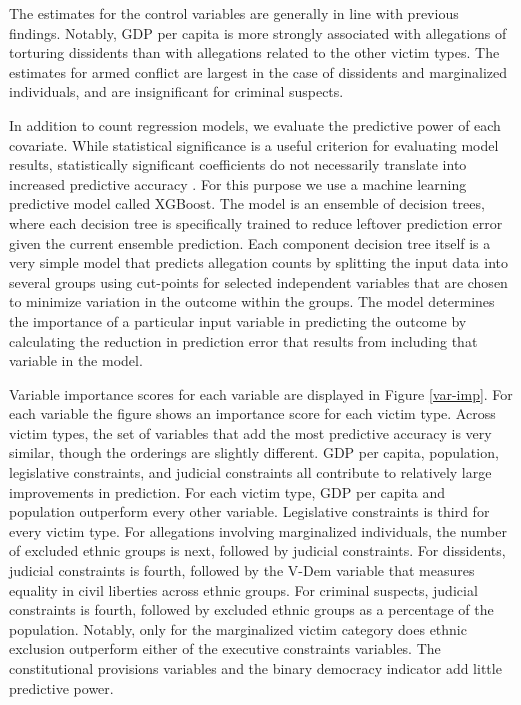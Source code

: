\documentclass[11pt]{article}
\begin{document}
The estimates for the control variables are generally in line with previous findings. Notably, GDP per capita is more strongly associated with allegations of torturing dissidents than with allegations related to the other victim types. The estimates for armed conflict are largest in the case of dissidents and marginalized individuals, and are insignificant for criminal suspects. 

In addition to count regression models, we evaluate the predictive power of each covariate. While statistical significance is a useful criterion for evaluating model results, statistically significant coefficients do not necessarily translate into increased predictive accuracy \citep{ward2010perils,hill2014empirical}. For this purpose we use a machine learning predictive model called XGBoost. The model is an ensemble of decision trees, where each decision tree is specifically trained to reduce leftover prediction error given the current ensemble prediction. Each component decision tree itself is a very simple model that predicts allegation counts by splitting the input data into several groups using cut-points for selected independent variables that are chosen to minimize variation in the outcome within the groups. The model determines the importance of a particular input variable in predicting the outcome by calculating the reduction in prediction error that results from including that variable in the model. 

Variable importance scores for each variable are displayed in Figure \ref{var-imp}. For each variable the figure shows an importance score for each victim type. Across victim types, the set of variables that add the most predictive accuracy is very similar, though the orderings are slightly different. GDP per capita, population, legislative constraints, and judicial constraints all contribute to relatively large improvements in prediction. For each victim type, GDP per capita and population outperform every other variable. Legislative constraints is third for every victim type. For allegations involving marginalized individuals, the number of excluded ethnic groups is next, followed by judicial constraints. For dissidents, judicial constraints is fourth, followed by the V-Dem variable that measures equality in civil liberties across ethnic groups. For criminal suspects, judicial constraints is fourth, followed by excluded ethnic groups as a percentage of the population. Notably, only for the marginalized victim category does ethnic exclusion outperform either of the executive constraints variables. The constitutional provisions variables and the binary democracy indicator add little predictive power.  
\end{document}
